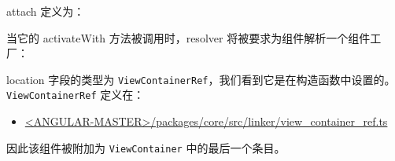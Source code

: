 attach 定义为：




当它的 activateWith 方法被调用时，resolver 将被要求为组件解析一个组件工厂：




location 字段的类型为 \texttt{ViewContainerRef}，我们看到它是在构造函数中设置的。
\texttt{ViewContainerRef} 定义在：

\begin{itemize}
  \item \href{https://github.com/angular/angular/blob/master/packages/core/src/linker/view_container_ref.ts}
        {<ANGULAR-MASTER>/packages/core/src/linker/view\_container\_ref.ts}
\end{itemize}




因此该组件被附加为 \texttt{ViewContainer} 中的最后一个条目。
